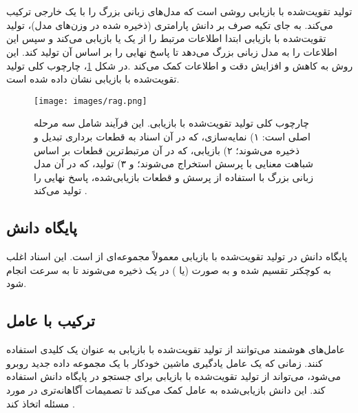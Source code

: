 \section[تولید تقویت‌شده با بازیابی]{}
تولید تقویت‌شده با بازیابی \cite{Lewis2020RAG} روشی است که مدل‌های زبانی بزرگ را با یک  خارجی ترکیب می‌کند. به جای تکیه صرف بر دانش پارامتری (ذخیره شده در وزن‌های مدل)، تولید تقویت‌شده با بازیابی ابتدا اطلاعات مرتبط را از یک  یا  بازیابی می‌کند و سپس این اطلاعات را به مدل زبانی بزرگ می‌دهد تا پاسخ نهایی را بر اساس آن تولید کند. این روش به کاهش  و افزایش دقت و  اطلاعات کمک می‌کند \cite{xia2025ragselfreasoning}.در شکل \ref{fig:rag}، چارچوب کلی تولید تقویت‌شده با بازیابی نشان داده شده است.
\begin{figure}[h!]
    \centering
    \texttt{[image: images/rag.png]}
    \caption[چارچوب کلی تولید تقویت‌شده با بازیابی]{
        چارچوب کلی تولید تقویت‌شده با بازیابی. این فرآیند شامل سه مرحله اصلی است: ۱) نمایه‌سازی، که در آن اسناد به قطعات برداری تبدیل و ذخیره می‌شوند؛ ۲) بازیابی، که در آن مرتبط‌ترین قطعات بر اساس شباهت معنایی با پرسش استخراج می‌شوند؛ و ۳) تولید، که در آن مدل زبانی بزرگ با استفاده از پرسش و قطعات بازیابی‌شده، پاسخ نهایی را تولید می‌کند
        \cite{gao2023retrieval}.
    }
    \label{fig:rag}
\end{figure}
\subsection{پایگاه دانش}
پایگاه دانش در تولید تقویت‌شده با بازیابی معمولاً مجموعه‌ای از  است. این اسناد اغلب به  کوچکتر تقسیم شده و به صورت  (یا ) در یک  ذخیره می‌شوند تا  به سرعت انجام شود.

\subsection{ترکیب با عامل}
عامل‌های هوشمند می‌توانند از تولید تقویت‌شده با بازیابی به عنوان یک  کلیدی استفاده کنند. زمانی که یک عامل یادگیری ماشین خودکار با یک مجموعه داده جدید روبرو می‌شود، می‌تواند از تولید تقویت‌شده با بازیابی برای جستجو در پایگاه دانش استفاده کند. این دانش بازیابی‌شده به عامل کمک می‌کند تا تصمیمات آگاهانه‌تری در مورد مسئله اتخاذ کند \cite{singh2025agenticrag}.

